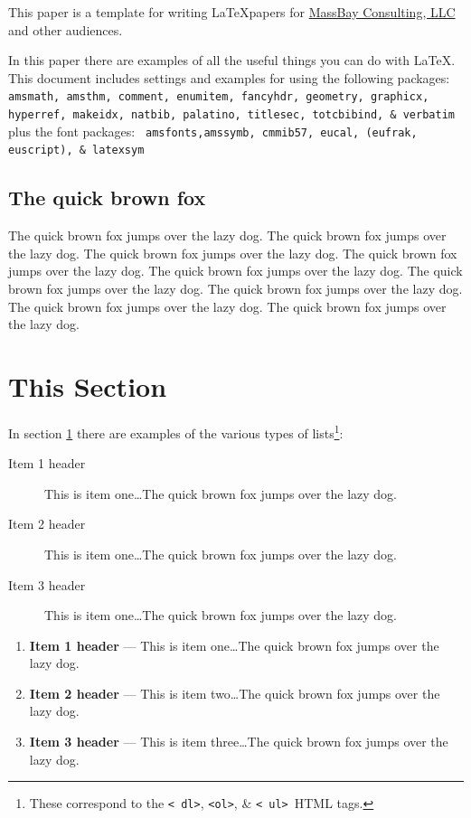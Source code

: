 \documentclass[11pt,twocolumn]{article}%
\numberwithin{equation}{section}%
\begin{document}
This paper is a template for writing \LaTeX papers for
\href{http://massbay.net}{MassBay Consulting, LLC} and other
audiences.

In this paper there are examples of all the useful things you can do
with \LaTeX. This document includes settings and examples for using
the following packages: {\tt amsmath, amsthm, comment, enumitem,
fancyhdr, geometry, graphicx, hyperref, makeidx, natbib, palatino,
titlesec, totcbibind, \& verbatim} plus the font packages: {\tt
amsfonts,amssymb, cmmib57, eucal, (eufrak, euscript), \& latexsym}

\subsection{The quick brown fox}
\label{The quick brown fox}

The quick brown fox
jumps over the lazy
dog. The quick brown fox jumps over the lazy dog. The
quick brown fox jumps over the lazy dog. The quick brown fox jumps
over the lazy dog. The quick brown fox jumps over the lazy dog. The
quick brown fox jumps over the lazy dog. The quick brown fox jumps
over the lazy dog. The quick brown fox jumps over the lazy dog. The
quick brown fox jumps over the lazy dog.

\section{This Section}
\label{This Section}

In section \ref{This Section} there are examples of the various
types of lists\footnote{These correspond to the {\tt \textless
dl\textgreater}, {\tt \textless ol\textgreater}, \& {\tt \textless
ul\textgreater}\ HTML tags.}:

\begin{description}
\item[Item 1 header] This is item one\dots The quick brown fox jumps
over the lazy dog.
\item[Item 2 header] This is item one\dots The quick brown fox jumps
over the lazy dog.
\item[Item 3 header] This is item one\dots The quick brown fox jumps
over the lazy dog.
\end{description}

\begin{enumerate}
\item {\bf Item 1 header} --- This is item one\dots The quick brown fox jumps
over the lazy dog.
\item {\bf Item 2 header} --- This is item two\dots The quick brown fox jumps
over the lazy dog.
\item {\bf Item 3 header} --- This is item three\dots The quick brown fox jumps
over the lazy dog.
\end{enumerate}
\end{document}
